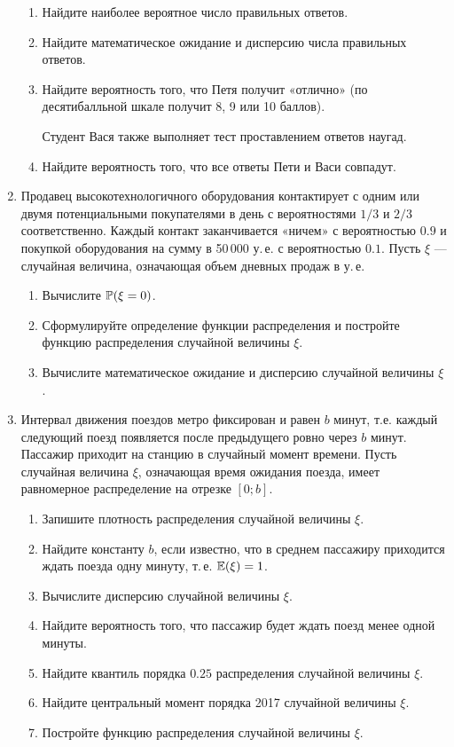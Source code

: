\begin{enumerate}
\begin{enumerate}
\item	Найдите наиболее вероятное число правильных ответов.
\item	Найдите математическое ожидание и дисперсию числа правильных ответов.
\item	Найдите вероятность того, что Петя получит «отлично»
(по десятибалльной шкале получит 8, 9 или 10 баллов).

Студент Вася также выполняет тест проставлением ответов наугад.

\item	Найдите вероятность того, что все ответы Пети и Васи совпадут.
\end{enumerate}

\item  Продавец высокотехнологичного оборудования контактирует с одним или двумя
потенциальными покупателями в день с вероятностями $1/3$ и $2/3$ соответственно.
Каждый контакт заканчивается «ничем» с вероятностью $0.9$ и покупкой оборудования
на сумму в 50\,000 у.\,е. с вероятностью $0.1$.
Пусть $\xi$ — случайная величина, означающая объем дневных продаж в у.\,е.

\begin{enumerate}
\item	Вычислите  $\P(\xi = 0)$.
\item	Сформулируйте определение функции распределения и постройте функцию распределения
случайной величины $\xi$.
\item	Вычислите математическое ожидание и дисперсию случайной величины $\xi$.
\end{enumerate}

\item Интервал движения поездов метро фиксирован и равен $b$ минут,
т.е. каждый следующий поезд появляется после предыдущего ровно через $b$ минут.
Пассажир приходит на станцию в случайный момент времени.
Пусть случайная величина $\xi$, означающая время ожидания поезда,
имеет равномерное распределение на отрезке $[0; b]$.

\begin{enumerate}
\item Запишите плотность распределения случайной величины $\xi$.
\item	Найдите константу $b$, если известно, что в среднем пассажиру приходится
ждать поезда одну минуту, т.\,е. $\E(\xi) = 1$.
\item	Вычислите дисперсию случайной величины $\xi$.
\item	Найдите вероятность того, что пассажир будет ждать поезд менее одной минуты.
\item	Найдите квантиль порядка $0.25$ распределения случайной величины $\xi$.
\item	Найдите центральный момент порядка 2017 случайной величины $\xi$.
\item	Постройте функцию распределения случайной величины $\xi$.


\end{enumerate}
\end{enumerate}
